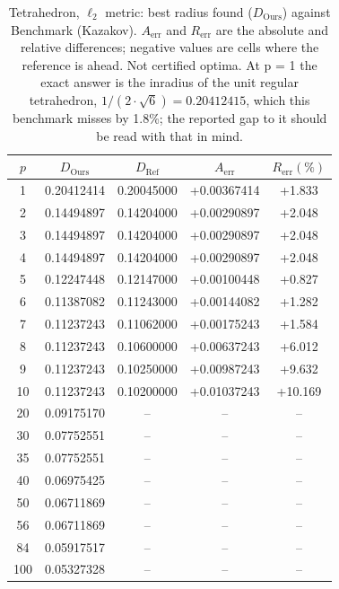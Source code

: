 \begin{table}[h!]
  \centering
  \caption{Tetrahedron, $\ell_2$ metric: best radius found ($D_{\mathrm{Ours}}$) against Benchmark (Kazakov). $A_{\text{err}}$ and $R_{\text{err}}$ are the absolute and relative differences; negative values are cells where the reference is ahead. Not certified optima. At p = 1 the exact answer is the inradius of the unit regular tetrahedron, $1/(2 \cdot \sqrt{6}) = 0.20412415$, which this benchmark misses by 1.8\%; the reported gap to it should be read with that in mind.}
  \label{tab:tetrahedron_euclidean}
  \begin{tabular}{ccccc}
    \hline
    $p$ & $D_{\mathrm{Ours}}$ & $D_{\mathrm{Ref}}$ & $A_{\text{err}}$ & $R_{\text{err}}(\%)$ \\
    \hline
    1 & 0.20412414 & 0.20045000 & +0.00367414 & +1.833 \\
    2 & 0.14494897 & 0.14204000 & +0.00290897 & +2.048 \\
    3 & 0.14494897 & 0.14204000 & +0.00290897 & +2.048 \\
    4 & 0.14494897 & 0.14204000 & +0.00290897 & +2.048 \\
    5 & 0.12247448 & 0.12147000 & +0.00100448 & +0.827 \\
    6 & 0.11387082 & 0.11243000 & +0.00144082 & +1.282 \\
    7 & 0.11237243 & 0.11062000 & +0.00175243 & +1.584 \\
    8 & 0.11237243 & 0.10600000 & +0.00637243 & +6.012 \\
    9 & 0.11237243 & 0.10250000 & +0.00987243 & +9.632 \\
    10 & 0.11237243 & 0.10200000 & +0.01037243 & +10.169 \\
    20 & 0.09175170 & -- & -- & -- \\
    30 & 0.07752551 & -- & -- & -- \\
    35 & 0.07752551 & -- & -- & -- \\
    40 & 0.06975425 & -- & -- & -- \\
    50 & 0.06711869 & -- & -- & -- \\
    56 & 0.06711869 & -- & -- & -- \\
    84 & 0.05917517 & -- & -- & -- \\
    100 & 0.05327328 & -- & -- & -- \\
    \hline
  \end{tabular}
\end{table}
